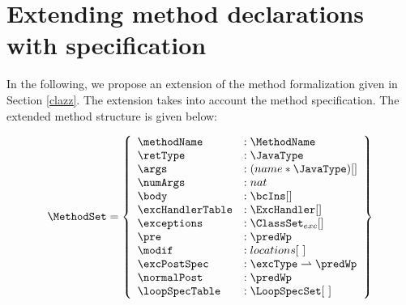 \section{Extending method declarations with specification}\label{methExtend}

In the following, we propose an extension of the method formalization given in Section \ref{clazz}.
 The extension takes into account the method specification. The extended method structure is given below:

$$ \begin{array}{l} %
                     \MethodSet  = \left\{\begin{array}{ll}  
                                                          \methodName & :\MethodName\\
						          \retType & :\JavaType\\
							  \args &  : (name * \JavaType) [] \\
							  \numArgs & : nat \\
							  \body &  : \bcIns [] \\
							  \excHandlerTable & : \ExcHandler [] \\
							  \exceptions &  : \ClassSet_{exc}[] \\
							  \pre & : \predWp \\
							  \modif & : locations\lbrack \ \rbrack  \\
							  \excPostSpec & : \excType \rightharpoonup \predWp \\
							  \normalPost & : \predWp \\
                                                          \loopSpecTable & : \LoopSpecSet \lbrack \ \rbrack  
							  
                                     \end{array}  \right\} 
     \end{array} $$


